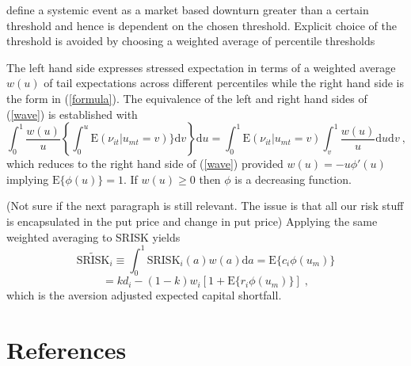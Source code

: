 \documentclass[authoryear]{elsarticle}
\newcommand{\E}{\mathrm{E}}
\newcommand{\de}{\mathrm{d}}
\newcommand{\eref}[1]{(\ref{#1})}
\begin{document}
\cite{brownlees2015} define a systemic event as a market based downturn greater than a certain threshold and hence is dependent on the chosen threshold.   Explicit choice of the threshold is avoided by choosing a weighted average of percentile thresholds 



The left hand side expresses stressed expectation in terms of a weighted average $w(u)$ of tail expectations across different percentiles while the right hand side is the  form in \eref{formula}.  The equivalence of the left and right hand sides of \eref{wave}  is established with
$$
\int_0^1 \frac{w(u)}{u} \left\{ \int_0^u \E(\nu_{it}|u_{mt}=v)\} \de v \right\}  \de u =\int_0^1\E(\nu_{it}|u_{mt}=v)\int_v^1  \frac{w(u)}{u} \de u \de v\ ,   
$$
which reduces to the right hand side of \eref{wave}  provided $w(u)=-u\phi'(u)$ implying $\E\{\phi(u)\}=1$.
If $w(u)\ge 0$ then  $\phi$ is a decreasing function. 

(Not sure if the next paragraph is still relevant.   The issue is that all our risk stuff is encapsulated in the put price and change in put price)  Applying the same weighted averaging to SRISK yields
$$
\widetilde{\mathrm{SRISK}}_i \equiv \int_0^1 \mathrm{SRISK}_i(a) w(a) \de a = \E\{c_i\phi(u_m)\} 
$$
$$
= kd_i-(1-k)w_i[1+\E\{r_i\phi(u_m)\}] \;,
$$
which is the aversion adjusted expected capital shortfall.






\section*{References}

\end{document}
